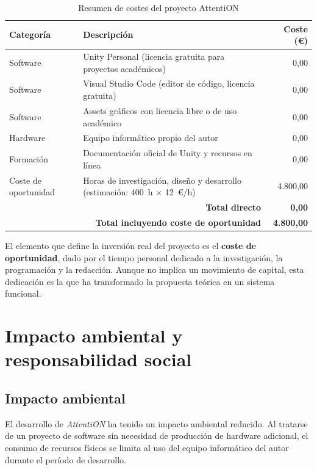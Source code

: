 \documentclass[12pt, a4paper]{report}
\begin{document}
\begin{table}[H]
\centering
\caption{Resumen de costes del proyecto AttentiON}
\label{tab:costes}
\renewcommand{\arraystretch}{1.3}
\begin{tabularx}{\textwidth}{|l|X|r|}
\hline
\textbf{Categoría} & \textbf{Descripción} & \textbf{Coste (€)} \\
\hline
Software & Unity Personal (licencia gratuita para proyectos académicos) & 0{,}00 \\
\hline
Software & Visual Studio Code (editor de código, licencia gratuita) & 0{,}00 \\
\hline
Software & Assets gráficos con licencia libre o de uso académico & 0{,}00 \\
\hline
Hardware & Equipo informático propio del autor & 0{,}00 \\
\hline
Formación & Documentación oficial de Unity y recursos en línea & 0{,}00 \\
\hline
Coste de oportunidad & Horas de investigación, diseño y desarrollo
  (estimación: 400~h $\times$ 12~€/h) & 4.800{,}00 \\
\hline
\multicolumn{2}{|r|}{\textbf{Total directo}} & \textbf{0{,}00} \\
\hline
\multicolumn{2}{|r|}{\textbf{Total incluyendo coste de oportunidad}} &
  \textbf{4.800{,}00} \\
\hline
\end{tabularx}
\end{table}

El elemento que define la inversión real del proyecto es el \textbf{coste de
oportunidad}, dado por el tiempo personal dedicado a la investigación, la
programación y la redacción. Aunque no implica un movimiento de capital, esta
dedicación es la que ha transformado la propuesta teórica en un sistema
funcional.

\section{Impacto ambiental y responsabilidad social}

\subsection{Impacto ambiental}

El desarrollo de \textit{AttentiON} ha tenido un impacto ambiental reducido.
Al tratarse de un proyecto de software sin necesidad de producción de hardware
adicional, el consumo de recursos físicos se limita al uso del equipo informático
del autor durante el período de desarrollo.
\end{document}
